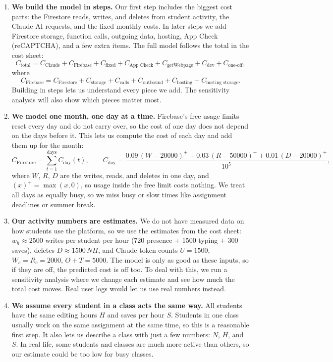 \documentclass{article}
\begin{document}
\begin{enumerate}
    \item \textbf{We build the model in steps.}
    Our first step includes the biggest cost parts: the Firestore reads, writes, and deletes from student activity, the Claude AI requests, and the fixed monthly costs. In later steps we add Firestore storage, function calls, outgoing data, hosting, App Check (reCAPTCHA), and a few extra items. The full model follows the total in the cost sheet:
    \[
    C_{\text{total}} = C_{\text{Claude}} + C_{\text{Firebase}} + C_{\text{fixed}} + C_{\text{App Check}} + C_{\text{getWebpage}} + C_{\text{dev}} + C_{\text{one-off}},
    \]
    where
    \[
    C_{\text{Firebase}} = C_{\text{Firestore}} + C_{\text{storage}} + C_{\text{calls}} + C_{\text{outbound}} + C_{\text{hosting}} + C_{\text{hosting storage}}.
    \]
    Building in steps lets us understand every piece we add. The sensitivity analysis will also show which pieces matter most.

    \item \textbf{We model one month, one day at a time.}
    Firebase's free usage limits reset every day and do not carry over, so the cost of one day does not depend on the days before it. This lets us compute the cost of each day and add them up for the month:
    \[
    C_{\text{Firestore}} = \sum_{t=1}^{\text{days}} C_{\text{day}}(t), \qquad
    C_{\text{day}} = \frac{0.09\,(W-20000)^+ + 0.03\,(R-50000)^+ + 0.01\,(D-20000)^+}{10^5},
    \]
    where $W$, $R$, $D$ are the writes, reads, and deletes in one day, and $(x)^+ = \max(x,0)$, so usage inside the free limit costs nothing. We treat all days as equally busy, so we miss busy or slow times like assignment deadlines or summer break.

    \item \textbf{Our activity numbers are estimates.}
    We do not have measured data on how students use the platform, so we use the estimates from the cost sheet: $w_h \approx 2500$ writes per student per hour (720 presence $+$ 1500 typing $+$ 300 saves), deletes $D \approx 1500\,NH$, and Claude token counts $U=1500$, $W_c=R_c=2000$, $O+T=5000$. The model is only as good as these inputs, so if they are off, the predicted cost is off too. To deal with this, we run a sensitivity analysis where we change each estimate and see how much the total cost moves. Real user logs would let us use real numbers instead.

    \item \textbf{We assume every student in a class acts the same way.}
    All students have the same editing hours $H$ and saves per hour $S$. Students in one class usually work on the same assignment at the same time, so this is a reasonable first step. It also lets us describe a class with just a few numbers: $N$, $H$, and $S$. In real life, some students and classes are much more active than others, so our estimate could be too low for busy classes.


\end{enumerate}
\end{document}
